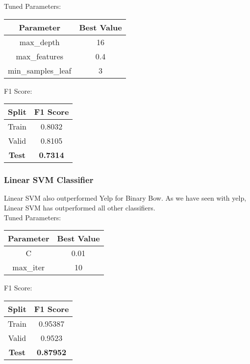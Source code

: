 \documentclass{article}
\begin{document}
Tuned Parameters:
\begin{center}
\begin{tabular}{ |c|c| } 
	\hline
	\textbf{Parameter} & \textbf{Best Value} \\ 
	\hline
	max\_depth & 16 \\ 
    max\_features & 0.4 \\
    min\_samples\_leaf & 3 \\
	\hline
\end{tabular}
\end{center}

F1 Score:
\begin{center}
\begin{tabular}{ |c|c| } 
	\hline
	\textbf{Split} & \textbf{F1 Score} \\ 
	\hline
	Train & 0.8032 \\
	Valid & 0.8105 \\ 
	\textbf{Test} & \textbf{0.7314} \\
	\hline
\end{tabular}
\end{center}

\subsubsection{Linear SVM Classifier}
Linear SVM also outperformed Yelp for Binary Bow. As we have seen with yelp, Linear SVM has outperformed all other classifiers. \\

Tuned Parameters:
\begin{center}
\begin{tabular}{ |c|c| } 
	\hline
	\textbf{Parameter} & \textbf{Best Value} \\ 
	\hline
	C & 0.01 \\ 
    max\_iter & 10 \\
	\hline
\end{tabular}
\end{center}

F1 Score:
\begin{center}
\begin{tabular}{ |c|c| } 
	\hline
	\textbf{Split} & \textbf{F1 Score} \\ 
	\hline
	Train & 0.95387 \\
	Valid & 0.9523 \\ 
	\textbf{Test} & \textbf{0.87952} \\
	\hline
\end{tabular}
\end{center}
\end{document}
